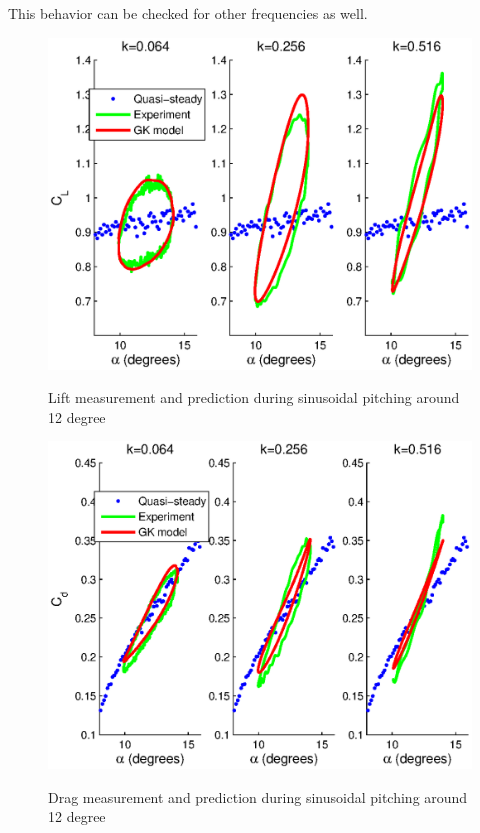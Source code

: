 \FloatBarrier

\par This behavior can be checked for other frequencies as well.

\begin{figure}[h]
  \begin{center}
    \scalebox{1.0}  
    {\includegraphics{./Figures/Pitching_allcases_GK_CL_12_amp_2.eps}}
  \end{center}
  \caption{Lift measurement and prediction during sinusoidal pitching around 12 degree} 
  \label{fig:Pitching_allcases_GK_Cl_12}
\end{figure}

\begin{figure}[h]
  \begin{center}
    \scalebox{1.0}  
    {\includegraphics{./Figures/Pitching_allcases_GK_CD_12_amp_2.eps}}
  \end{center}
  \caption{Drag measurement and prediction during sinusoidal pitching around 12 degree} 
  \label{fig:Pitching_allcases_GK_Cd_12}
\end{figure}

